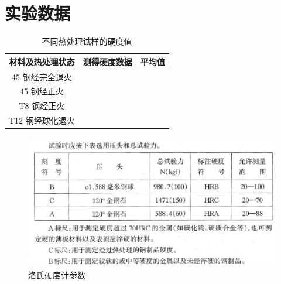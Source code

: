 \documentclass[a4paper,utf8]{article}
\begin{document}
\section{实验数据}
\begin{table}[!ht]\centering
    \caption{不同热处理试样的硬度值}
    \extrarowheight=11pt
    \begin{tabularx}{\textwidth}{|c|X|X|X|X|}\hline
        材料及热处理状态 & \multicolumn{3}{c|}{测得硬度数据} & \hfil 平均值 \hfil \\[10pt] \hline
        45 钢经完全退火 &  &  &  &  \\[10pt] \hline
        45 钢经正火 &  &  &  &  \\[10pt] \hline
        T8 钢经正火 &  &  &  &  \\[10pt] \hline
        T12 钢经球化退火 &  &  &  &  \\[10pt] \hline
    \end{tabularx}
\end{table}
\begin{figure}[!ht]
    \caption{洛氏硬度计参数}
    \includegraphics[width=\textwidth]{fig3.jpg}
\end{figure}
\end{document}
